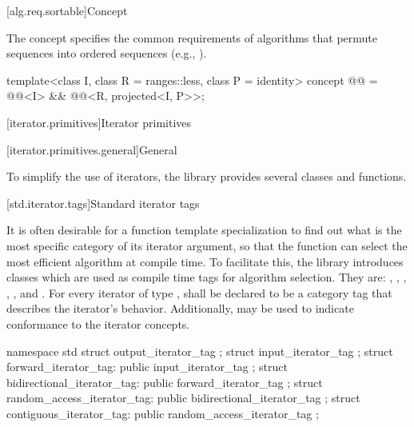 [alg.req.sortable]{Concept }

\pnum
The  concept specifies the common requirements of
algorithms that permute sequences into ordered sequences (e.g., ).

\begin{codeblock}
template<class I, class R = ranges::less, class P = identity>
  concept @@ =
    @@<I> &&
    @@<R, projected<I, P>>;
\end{codeblock}

[iterator.primitives]{Iterator primitives}

[iterator.primitives.general]{General}

\pnum
To simplify the use of iterators, the library provides
several classes and functions.

[std.iterator.tags]{Standard iterator tags}

\pnum
{}%
%
%
%
%
%
It is often desirable for a
function template specialization
to find out what is the most specific category of its iterator
argument, so that the function can select the most efficient algorithm at compile time.
To facilitate this, the
library introduces
classes which are used as compile time tags for algorithm selection.
They are:
,
,
,
,
,
and
.
For every iterator of type
,
shall be declared to be a category tag that describes the
iterator's behavior.
Additionally,
may be used to indicate conformance to
the iterator concepts.

\begin{codeblock}
namespace std {
  struct output_iterator_tag { };
  struct input_iterator_tag { };
  struct forward_iterator_tag: public input_iterator_tag { };
  struct bidirectional_iterator_tag: public forward_iterator_tag { };
  struct random_access_iterator_tag: public bidirectional_iterator_tag { };
  struct contiguous_iterator_tag: public random_access_iterator_tag { };
}
\end{codeblock}

